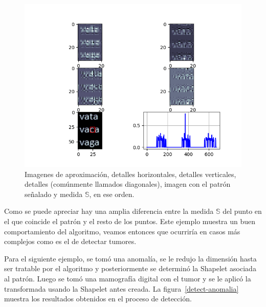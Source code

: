 \begin{figure}[h]
\center
\includegraphics[scale=1]{Graphics/CDetect.png}
\caption{Imagenes de aproximaci\'on, detalles horizontales, detalles verticales, detalles (com\'unmente llamados diagonales), imagen con el patr\'on se\~nalado y medida $\mathbb{S}$, en ese orden.}
\label{c-detected}
\end{figure}

\par Como se puede apreciar hay una amplia diferencia entre la medida $\mathbb{S}$ del punto en el que coincide el patr\'on y el resto de los puntos. Este ejemplo muestra un buen comportamiento del algoritmo, veamos entonces que ocurrir\'ia en casos m\'as complejos como es el de detectar tumores.\\

\par Para el siguiente ejemplo, se tom\'o una anomal\'ia, se le redujo la dimensi\'on hasta ser tratable por el algoritmo y posteriormente se determin\'o la Shapelet asociada al patr\'on. Luego se tom\'o una mamograf\'ia digital con el tumor y se le aplic\'o la transformada usando la Shapelet antes creada. La figura~\ref{detect-anomalia} muestra los resultados obtenidos en el proceso de detecci\'on.

